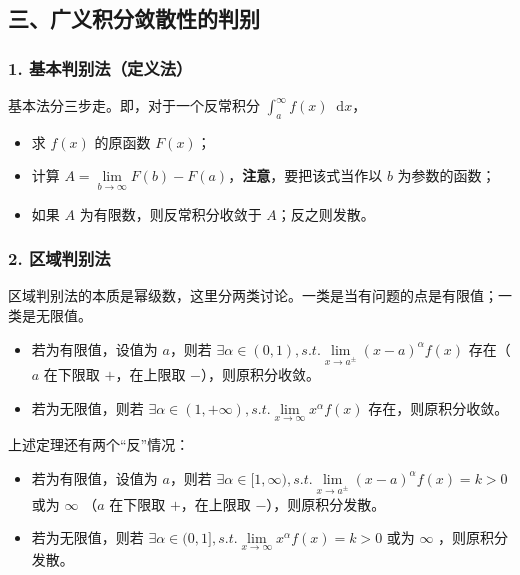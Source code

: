 \documentclass[b5paper]{ctexart}
\renewcommand{\d}{\mathop{}\!\mathrm{d}}
\begin{document}
	\subsection*{三、广义积分敛散性的判别}
	
	\subsubsection*{1. 基本判别法（定义法）}
	基本法分三步走。即，对于一个反常积分 $\int_{a}^{\infty} f(x) \d x$，
	\begin{itemize}
		\item 求 $f(x)$ 的原函数 $F(x)$；
		\item 计算 $A = \lim\limits_{b \to \infty} F(b) - F(a)$，\textbf{注意}，要把该式当作以 $b$ 为参数的函数；
		\item 如果 $A$ 为有限数，则反常积分收敛于 $A$；反之则发散。
	\end{itemize}
	
	\subsubsection*{2. 区域判别法}
	
	区域判别法的本质是幂级数，这里分两类讨论。一类是当有问题的点是有限值；一类是无限值。
	
	\begin{itemize}
		\item 若为有限值，设值为 $a$，则若 $\exists \alpha \in (0,1), s.t. \lim\limits_{x \to a^{\pm}}  (x - a) ^{\alpha} f(x)$ 存在（$a$ 在下限取 $+$，在上限取 $-$），则原积分收敛。
		
		\item 若为无限值，则若 $\exists \alpha \in (1, +\infty), s.t. \lim\limits_{x \to \infty}   x^{\alpha} f(x)$ 存在，则原积分收敛。
	\end{itemize}
	
	上述定理还有两个“反”情况：
	
	\begin{itemize}
		\item 若为有限值，设值为 $a$，则若 $\exists \alpha \in [1, \infty), s.t. \lim\limits_{x \to a^{\pm}}  (x - a) ^{\alpha} f(x) = k > 0$ 或为 $\infty$ （$a$ 在下限取 $+$，在上限取 $-$），则原积分发散。
		
		\item 若为无限值，则若 $\exists \alpha \in (0,1], s.t. \lim\limits_{x \to \infty}   x^{\alpha} f(x)= k > 0$ 或为 $\infty$ ，则原积分发散。
	\end{itemize}
	
\end{document}

